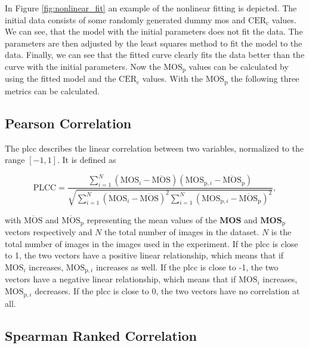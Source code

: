 In Figure \ref{fig:nonlinear_fit} an example of the nonlinear fitting is depicted.
The initial data consists of some randomly generated dummy \gls{mos} and $\text{CER}_{\text{c}}$ values.
We can see, that the model with the initial parameters does not fit the data.
The parameters are then adjusted by the least squares method \cite{least_squares_1978} to fit the model to the data.
Finally, we can see that the fitted curve clearly fits the data better than the curve with the initial parameters.
Now the $\text{MOS}_{\text{p}}$ values can be calculated by using the fitted model and the $\text{CER}_{\text{c}}$ values.
With the $\text{MOS}_{\text{p}}$ the following three metrics \cite{iqa_survey_2021} can be calculated.

\subsection{Pearson Correlation}
\label{subsec:pearson}

The \gls{plcc} \cite{pears_spear_2016} describes the linear correlation between two variables, normalized to the range $[-1, 1]$.
It is defined as

\begin{equation}
    \text{PLCC} = \frac{\sum_{i=1}^{N}{(\text{MOS}_{i}-\overline{\text{MOS}})(\text{MOS}_{\text{p},i}-\overline{\text{MOS}}_{\text{p}})}}{\sqrt{\sum_{i=1}^{N}{(\text{MOS}_{i}-\overline{\text{MOS}})^2}\sum_{i=1}^{N}{(\text{MOS}_{\text{p},i}-\overline{\text{MOS}}_{\text{p}})^2}}},
    \label{eq:pearson}
\end{equation}

with $\overline{\text{MOS}}$ and $\overline{\text{MOS}}_{\text{p}}$ representing the mean values of the $\mathbf{MOS}$ and $\mathbf{MOS}_{\text{p}}$ vectors respectively and $N$ the total number of images in the dataset.
$N$ is the total number of images in the images used in the experiment.
If the \gls{plcc} is close to 1, the two vectors have a positive linear relationship, which means that if $\text{MOS}_{i}$ increases, $\text{MOS}_{\text{p},i}$ increases as well.
If the \gls{plcc} is close to -1, the two vectors have a negative linear relationship, which means that if $\text{MOS}_{i}$ increases, $\text{MOS}_{\text{p},i}$ decreases.
If the \gls{plcc} is close to 0, the two vectors have no correlation at all.

\subsection{Spearman Ranked Correlation}
\label{subsec:spearman}

